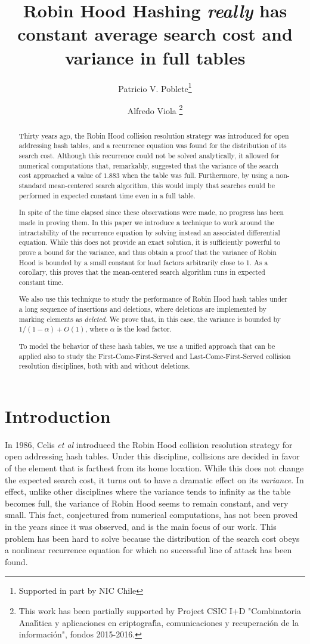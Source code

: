 \documentclass[proceedings]{aofa}
\author[P.V Poblete and A. Viola]{Patricio V. Poblete\addressmark{1}\thanks{
Supported in part by NIC Chile
}\and Alfredo Viola\addressmark{2}
\thanks{
This work has been partially supported by Project
CSIC I+D "Combinatoria Anal\'{\i}tica y aplicaciones en
criptograf\'{\i}a, comunicaciones y recuperaci\'on de la
informaci\'on", fondos 2015-2016.}
}
\title{Robin Hood Hashing \emph{really} has constant average search cost and variance in full tables}
\begin{document}
\maketitle
\begin{abstract}
Thirty years ago, the Robin Hood collision resolution strategy was introduced for open addressing hash tables, and a recurrence equation was found for the distribution of its search cost. Although this recurrence could not be solved analytically, it allowed for numerical computations that, remarkably, suggested that the variance of the search cost approached a value of $1.883$ when the table was full. Furthermore, by using a non-standard mean-centered search algorithm, this would imply that searches could be performed in expected constant time even in a full table.

In spite of the time elapsed since these observations were made, no progress has been made in proving them.
In this paper we introduce a technique to work around the intractability of the recurrence equation by solving instead an associated differential equation. While this does not provide an exact solution, it is sufficiently powerful to prove a bound for the variance, and thus obtain a proof that the variance of Robin Hood is bounded by a small constant for load factors arbitrarily close to 1. As a corollary, this proves that the mean-centered search algorithm runs in expected constant time.

We also use this technique to study the performance of Robin Hood hash tables under a long sequence of insertions and deletions, where deletions are implemented by marking elements as {\em deleted}. We prove that, in this case, the variance is bounded by $1/(1-\alpha)+O(1)$, where $\alpha$ is the load factor.

To model the behavior of these hash tables, we use a unified approach that can be applied also to study the First-Come-First-Served and Last-Come-First-Served collision resolution disciplines, both with and without deletions.

\end{abstract}

\section{Introduction}
In 1986,  Celis {\it{et al}} \cite{CelisT,Celis} introduced the Robin Hood collision resolution strategy for open addressing hash tables. Under this discipline, collisions are decided in favor of the element that is farthest from its home location.
While this does not change the expected search cost, it turns out to have a dramatic effect on its {\em variance}. In effect, unlike other disciplines where the variance tends to infinity as the table becomes full, the variance of Robin Hood seems to remain constant, and very small. This fact, conjectured from numerical computations, has not been proved in the years since it was observed, and is the main focus of our work. This problem has been hard to solve because the distribution of the search cost obeys a nonlinear recurrence equation for which no successful line of attack has been found.
\end{document}
